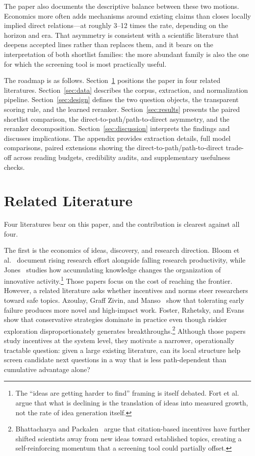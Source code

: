 \documentclass[11pt]{article}
\begin{document}
The paper also documents the descriptive balance between these two motions. Economics more often adds mechanisms around existing claims than closes locally implied direct relations---at roughly 3--12 times the rate, depending on the horizon and era. That asymmetry is consistent with a scientific literature that deepens accepted lines rather than replaces them, and it bears on the interpretation of both shortlist families: the more abundant family is also the one for which the screening tool is most practically useful.

The roadmap is as follows. Section~\ref{sec:relatedlit} positions the paper in four related literatures. Section~\ref{sec:data} describes the corpus, extraction, and normalization pipeline. Section~\ref{sec:design} defines the two question objects, the transparent scoring rule, and the learned reranker. Section~\ref{sec:results} presents the paired shortlist comparison, the direct-to-path/path-to-direct asymmetry, and the reranker decomposition. Section~\ref{sec:discussion} interprets the findings and discusses implications. The appendix provides extraction details, full model comparisons, paired extensions showing the direct-to-path/path-to-direct trade-off across reading budgets, credibility audits, and supplementary usefulness checks.

\section{Related Literature}
\label{sec:relatedlit}

Four literatures bear on this paper, and the contribution is clearest against all four.

The first is the economics of ideas, discovery, and research direction. Bloom et al.~\citeyearpar{bloom2020ideas} document rising research effort alongside falling research productivity, while Jones~\citeyearpar{jones2009burden} studies how accumulating knowledge changes the organization of innovative activity.\footnote{The ``ideas are getting harder to find'' framing is itself debated. Fort et al.~\citeyearpar{fort2025growth} argue that what is declining is the translation of ideas into measured growth, not the rate of idea generation itself.} Those papers focus on the cost of reaching the frontier. However, a related literature asks whether incentives and norms steer researchers toward safe topics. Azoulay, Graff Zivin, and Manso~\citeyearpar{azoulay2011incentives} show that tolerating early failure produces more novel and high-impact work. Foster, Rzhetsky, and Evans~\citeyearpar{foster2015tradition} show that conservative strategies dominate in practice even though riskier exploration disproportionately generates breakthroughs.\footnote{Bhattacharya and Packalen~\citeyearpar{packalen2020stagnation} argue that citation-based incentives have further shifted scientists away from new ideas toward established topics, creating a self-reinforcing momentum that a screening tool could partially offset.} Although those papers study incentives at the system level, they motivate a narrower, operationally tractable question: given a large existing literature, can its local structure help screen candidate next questions in a way that is less path-dependent than cumulative advantage alone?
\end{document}
